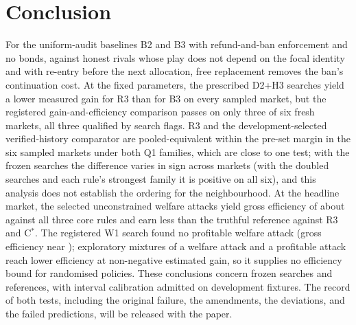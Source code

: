 \documentclass[11pt]{article}
\begin{document}
\section{Conclusion}\label{sec:conclusion}
For the uniform-audit baselines B2 and B3 with refund-and-ban enforcement and no bonds, against honest rivals whose play does not depend on the focal identity and with re-entry before the next allocation, free replacement removes the ban's continuation cost. At the fixed parameters, the prescribed D2+H3 searches yield a lower measured gain for R3 than for B3 on every sampled market, but the registered gain-and-efficiency comparison passes on only three of six fresh markets, all three qualified by search flags. R3 and the development-selected verified-history comparator are pooled-equivalent within the pre-set margin in the six sampled markets under both Q1 families, which are close to one test; with the frozen searches the difference varies in sign across markets (with the doubled searches and each rule's strongest family it is positive on all six), and this analysis does not establish the ordering for the neighbourhood. At the headline market, the selected unconstrained welfare attacks yield gross efficiency of about  against all three core rules and earn less than the truthful reference against R3 and C$^*$. The registered W1 search found no profitable welfare attack (gross efficiency near ); exploratory mixtures of a welfare attack and a profitable attack reach lower efficiency at non-negative estimated gain, so it supplies no efficiency bound for randomised policies. These conclusions concern frozen searches and references, with interval calibration admitted on development fixtures. The record of both tests, including the original failure, the amendments, the deviations, and the failed predictions, will be released with the paper.
\end{document}
